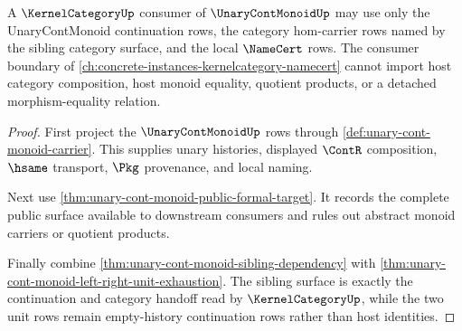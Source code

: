 \begin{theorem}
\label{thm:unary-cont-monoid-kernel-category-consumer-boundary}
A $\KernelCategoryUp$ consumer of $\UnaryContMonoidUp$ may use only the UnaryContMonoid continuation rows, the category hom-carrier rows named by the sibling category surface, and the local $\NameCert$ rows. The consumer boundary of \autoref{ch:concrete-instances-kernelcategory-namecert} cannot import host category composition, host monoid equality, quotient products, or a detached morphism-equality relation.
\end{theorem}
\begin{proof}
First project the $\UnaryContMonoidUp$ rows through \autoref{def:unary-cont-monoid-carrier}. This supplies unary histories, displayed $\ContR$ composition, $\hsame$ transport, $\Pkg$ provenance, and local naming.

Next use \autoref{thm:unary-cont-monoid-public-formal-target}. It records the complete public surface available to downstream consumers and rules out abstract monoid carriers or quotient products.

Finally combine \autoref{thm:unary-cont-monoid-sibling-dependency} with \autoref{thm:unary-cont-monoid-left-right-unit-exhaustion}. The sibling surface is exactly the continuation and category handoff read by $\KernelCategoryUp$, while the two unit rows remain empty-history continuation rows rather than host identities.
\end{proof}


\begin{closurestatus}{\UnaryContMonoidUp}
  \theoryclosure{\matureClosure}
  \formalstatus{\unformalizedV}
\end{closurestatus}
